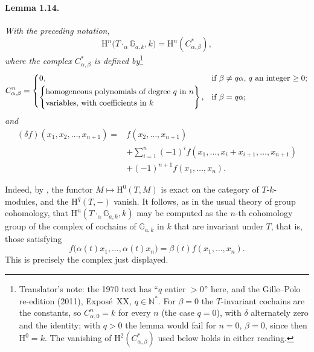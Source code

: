 \paragraph{\textbf{Lemma 1.14.}}
\emph{With the preceding notation,}
\[
  \mathrm H^n\bigl(T\mathbin{\cdot_\alpha}\mathbb G_{a,k},k\bigr)
    =\mathrm H^n(C^\ast_{\alpha,\beta}),
\]
\emph{where the complex \(C^\ast_{\alpha,\beta}\) is defined by}\footnote{Translator's note: the
1970 text has ``\(q\) entier \(>0\)'' here, and the Gille--Polo re-edition (2011), Exposé~XX,
\(q\in\mathbb N^\ast\). For \(\beta=0\) the \(T\)-invariant cochains are the constants, so
\(C^n_{\alpha,0}=k\) for every \(n\) (the case \(q=0\)), with \(\delta\) alternately zero and the
identity; with \(q>0\) the lemma would fail for \(n=0\), \(\beta=0\), since then
\(\mathrm H^0=k\). The vanishing of \(\mathrm H^2(C^\ast_{\alpha,\beta})\) used below holds in either
reading.}
\[
  C^n_{\alpha,\beta}=
  \begin{cases}
    0,&\text{if \(\beta\neq q\alpha\), \(q\) an integer \(\geq0\);}\\[2pt]
    \left\{\begin{array}{@{}l@{}}
      \text{homogeneous polynomials of degree \(q\) in \(n\)}\\
      \text{variables, with coefficients in \(k\)}
    \end{array}\right\},
      &\text{if \(\beta=q\alpha\);}
  \end{cases}
\]
\emph{and}
\[
\begin{aligned}
(\delta f)(x_1,x_2,\ldots,x_{n+1})
  ={}&f(x_2,\ldots,x_{n+1})\\
   &+\sum_{i=1}^{n}(-1)^i
       f(x_1,\ldots,x_i+x_{i+1},\ldots,x_{n+1})\\
   &+(-1)^{n+1}f(x_1,\ldots,x_n).
\end{aligned}
\]

Indeed, by , the functor
\(M\mapsto\mathrm H^0(T,M)\) is exact on the category of
\(T\)-\(k\)-modules, and the \(\mathrm H^q(T,-)\) vanish. It follows, as
in the usual theory of group cohomology, that
\(\mathrm H^n(T\mathbin{\cdot_\alpha}\mathbb G_{a,k},k)\) may be
computed as the \(n\)-th cohomology group of the complex of
cochains of \(\mathbb G_{a,k}\) in \(k\) that are invariant under
\(T\), that is, those satisfying
\[
  f\bigl(\alpha(t)x_1,\ldots,\alpha(t)x_n\bigr)
    =\beta(t)f(x_1,\ldots,x_n).
\]
This is precisely the complex just displayed.

